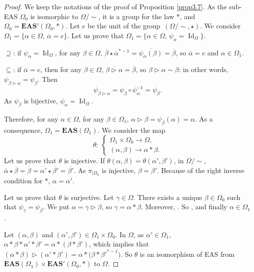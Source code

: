 \documentclass[10pt,a4paper]{amsart}
\numberwithin{equation}{section}
\newcommand{\eas}{\mathbf{EAS}}
\begin{document}
\begin{proof}
We keep the notations of the proof of Proposition \ref{prop3.7}. As the sub-EAS $\Omega_0$ is isomorphic to $\Omega/{\sim}$, it is a group for the law $*$, and $\Omega_0=\eas'(\Omega_0,*)$.
Let $e$ be the unit of the group~$(\Omega/{\sim},\star)$. We consider
$\Omega_1=\{\alpha\in \Omega,\, \overline{\alpha}=e\}$.
Let us prove that $\Omega_1=\{\alpha \in \Omega,\, \psi_\alpha=\operatorname{Id}_\Omega\}$.

$\supseteq$: if $\psi_\alpha=\operatorname{Id}_\Omega$, for any $\beta \in \Omega$, $\overline{\beta} \star \overline{\alpha}^{*-1}=\overline{\psi_\alpha(\beta)}=\overline{\beta}$, so $\overline{\alpha}=e$ and $\alpha \in \Omega_1$.

$\subseteq$: if $\overline{\alpha}=e$, then for any $\beta \in \Omega$, $\overline{\beta \triangleright \alpha}=\overline{\beta}$, so $\beta \triangleright \alpha\sim \beta$: in other words, $\psi_{\beta \triangleright \alpha}=\psi_\beta$. Then
\[\psi_{\beta \triangleright \alpha}=\psi_\beta \circ \psi_{\alpha}^{-1}=\psi_\beta.\]
As $\psi_\beta$ is bijective, $\psi_\alpha=\operatorname{Id}_\Omega$.

Therefore, for any $\alpha \in \Omega$, for any $\beta \in \Omega_1$,
$\alpha \triangleright \beta=\psi_\beta(\alpha)=\alpha$.
As a consequence, $\Omega_1=\eas(\Omega_1)$. We consider the map
\[\theta\colon\ \begin{cases}
\Omega_1\times \Omega_0 \longrightarrow \Omega,\\
(\alpha,\beta) \longrightarrow \alpha*\beta.
\end{cases}\]
Let us prove that $\theta$ is injective. If $\theta(\alpha,\beta)=\theta(\alpha',\beta')$, in $\Omega/{\sim}$,
$\overline{\alpha}\star \overline{\beta}=\overline{\beta}=\overline{\alpha'}\star \overline{\beta'}=\overline{\beta'}$.
As $\pi_{\mid \Omega_0}$ is injective, $\beta=\beta'$. Because of the right inverse condition for $*$, $\alpha=\alpha'$.

Let us prove that $\theta$ is surjective. Let $\gamma \in \Omega$. There exists a unique $\beta\in \Omega_0$ such that $\psi_{\overline{\gamma}}=\psi_{\overline{\beta}}$.
We put $\alpha=\gamma \triangleright \beta$, so $\gamma=\alpha*\beta$. Moreover,
.
So , and finally $\alpha\in \Omega_1$.

Let $(\alpha,\beta)$ and $(\alpha',\beta')\in \Omega_1 \times \Omega_0$. In $\Omega$, as $\alpha'\in \Omega_1$,
$\alpha*\beta*\alpha'*\beta'=\alpha*(\beta*\beta')$,
which implies that~${(\alpha*\beta)\triangleright (\alpha'*\beta')=\alpha* \bigl(\beta*\beta'^{*-1}\bigr)}$.
So $\theta$ is an isomorphism of EAS from $\eas(\Omega_1)\times \eas'(\Omega_0,*)$ to $\Omega$.
\end{proof}
\end{document}
